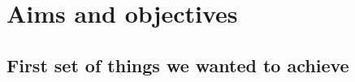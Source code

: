 \chapter[Aims]{Aims and objectives}\label{ch:aims}


\noindent \kant[21]

\section{First set of things we wanted to achieve}\label{sec:aims-first-group}

\kant[22-26]
